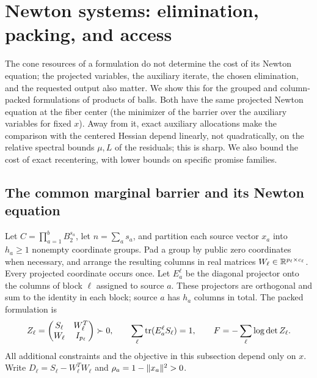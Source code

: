 \section{Newton systems: elimination, packing, and access}
\label{newt:section}

The cone resources of a formulation do not determine the cost of its
Newton equation; the projected variables, the auxiliary iterate, the
chosen elimination, and the requested output also matter.  We show this
for the grouped and column-packed formulations of products of balls.
Both have the same projected Newton equation at the fiber center (the
minimizer of the barrier over the auxiliary variables for fixed $x$).  Away
from it, exact auxiliary allocations make the comparison with the
centered Hessian depend linearly, not quadratically, on the relative
spectral bounds $\mu,L$ of the residuals; this is sharp.  We also bound the cost of exact recentering, with lower bounds on
specific promise families.

\subsection{The common marginal barrier and its Newton equation}

Let $C=\prod_{a=1}^b B_2^{s_a}$, let $n=\sum_a s_a$, and partition each
source vector $x_a$ into $h_a\geq1$ nonempty coordinate groups.  Pad a
group by public zero coordinates when necessary, and arrange the resulting
columns in real matrices $W_\ell\in\mathbb R^{p_\ell\times c_\ell}$.  Every
projected coordinate occurs once.  Let $E_a^\ell$ be the diagonal
projector onto the columns of block $\ell$ assigned to source $a$.
These projectors are orthogonal and sum to the identity in each block;
source $a$ has $h_a$ columns in total.  The packed formulation is
\begin{equation}\label{newt:packing}
 Z_\ell=\begin{pmatrix}S_\ell&W_\ell^T\\W_\ell&I_{p_\ell}\end{pmatrix}
 \succ0,\qquad
 \sum_\ell\operatorname{tr}(E_a^\ell S_\ell)=1,
 \qquad F=-\sum_\ell\log\det Z_\ell.
\end{equation}
All additional constraints and the objective in this subsection depend
only on $x$.  Write $D_\ell=S_\ell-W_\ell^TW_\ell$ and
$\rho_a=1-\lVert x_a\rVert^2>0$.


